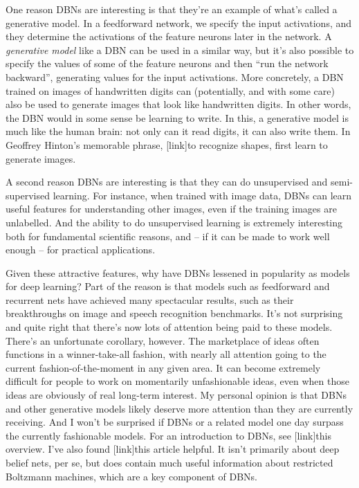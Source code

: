 \documentclass[a4paper,twoside,10pt]{book}
\begin{document}
One reason DBNs are interesting is that they're an example of what's called a generative model. In a feedforward network, we specify the input activations, and they determine the activations of the feature neurons later in the network. A \textit{generative model} like a DBN can be used in a similar way, but it's also possible to specify the values of some of the feature neurons and then ``run the network backward'', generating values for the input activations. More concretely, a DBN trained on images of handwritten digits can (potentially, and with some care) also be used to generate images that look like handwritten digits. In other words, the DBN would in some sense be learning to write. In this, a generative model is much like the human brain: not only can it read digits, it can also write them. In Geoffrey Hinton's memorable phrase, [link]to recognize shapes, first learn to generate images.

A second reason DBNs are interesting is that they can do unsupervised and semi-supervised learning. For instance, when trained with image data, DBNs can learn useful features for understanding other images, even if the training images are unlabelled. And the ability to do unsupervised learning is extremely interesting both for fundamental scientific reasons, and -- if it can be made to work well enough -- for practical applications.

Given these attractive features, why have DBNs lessened in popularity as models for deep learning? Part of the reason is that models such as feedforward and recurrent nets have achieved many spectacular results, such as their breakthroughs on image and speech recognition benchmarks. It's not surprising and quite right that there's now lots of attention being paid to these models. There's an unfortunate corollary, however. The marketplace of ideas often functions in a winner-take-all fashion, with nearly all attention going to the current fashion-of-the-moment in any given area. It can become extremely difficult for people to work on momentarily unfashionable ideas, even when those ideas are obviously of real long-term interest. My personal opinion is that DBNs and other generative models likely deserve more attention than they are currently receiving. And I won't be surprised if DBNs or a related model one day surpass the currently fashionable models. For an introduction to DBNs, see [link]this overview. I've also found [link]this article helpful. It isn't primarily about deep belief nets, per se, but does contain much useful information about restricted Boltzmann machines, which are a key component of DBNs.
\end{document}
